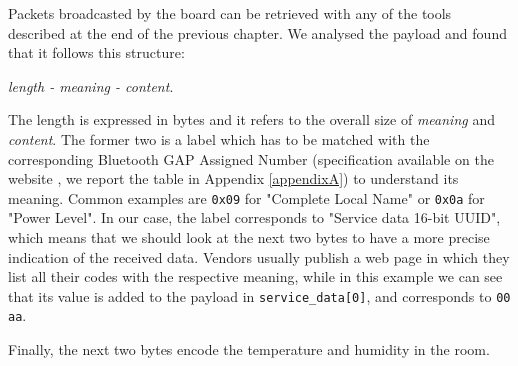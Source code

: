 Packets broadcasted by the board can be retrieved with any of the tools described at the end of the previous chapter. We analysed the payload and found that it follows this structure:
\begin{center}
	\textit{length - meaning - content}.
\end{center}
The length is expressed in bytes and it refers to the overall size of \textit{meaning} and \textit{content}. The former two is a label which has to be matched with the corresponding Bluetooth GAP Assigned Number (specification available on the website \cite{bt-GAP-numbers}, we report the table in Appendix \ref{appendixA}) to understand its meaning. Common examples are \texttt{0x09} for "Complete Local Name" or \texttt{0x0a} for "Power Level". In our case, the label corresponds to "Service data 16-bit UUID", which means that we should look at the next two bytes to have a more precise indication of the received data. Vendors usually publish a web page in which they list all their codes with the respective meaning, while in this example we can see that its value is added to the payload in \texttt{service\_data[0]}, and corresponds to \texttt{00 aa}.

Finally, the next two bytes encode the temperature and humidity in the room.
